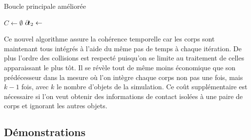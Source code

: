 \begin{algorithm}[h]
  \caption{Boucle principale améliorée}
  \label{algoMoteur2}
  \dontprintsemicolon
  \BlankLine
  $C \leftarrow \emptyset$\;
  \BlankLine
  \;
  $\partial \! t_2 \leftarrow$  
  \BlankLine
  \BlankLine
  \BlankLine
\end{algorithm}

Ce nouvel algorithme assure la cohérence temporelle car les corps sont
maintenant tous intégrés à l'aide du même pas de temps à chaque
itération. De plus l'ordre des collisions est respecté puisqu'on se
limite au traitement de celles apparaissant le plus tôt. Il se révèle
tout de même moins économique que son prédécesseur dans la mesure o\`u
l'on intègre chaque corps non pas une fois, mais $k-1$ fois, avec $k$
le nombre d'objets de la simulation. Ce coût supplémentaire est
nécessaire si l'on veut obtenir des informations de contact isolées à
une paire de corps et ignorant les autres objets.

\subsection{Démonstrations}

